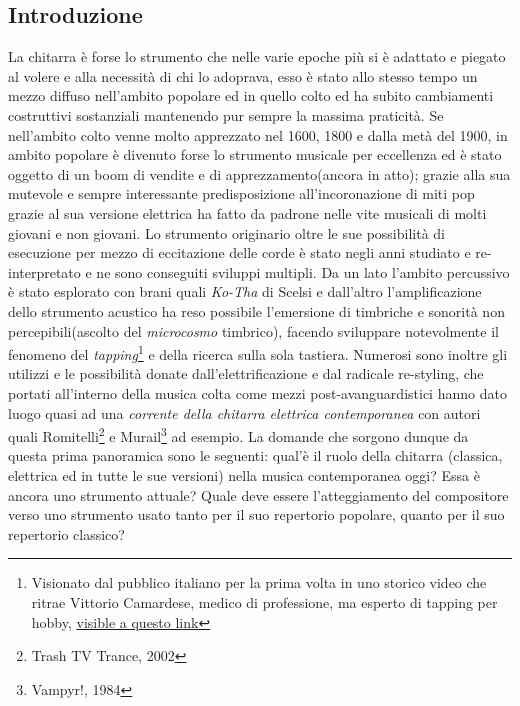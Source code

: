 \documentclass[oneside]{article}
\begin{document}
\newpage
\begin{multicols*}{2} %



\section{ Introduzione}
\noindent

La chitarra è forse lo strumento che nelle varie epoche più si è adattato e piegato al volere e alla necessità di chi lo adoprava, esso è stato allo stesso tempo un mezzo diffuso nell'ambito popolare ed in quello colto ed ha subito cambiamenti costruttivi sostanziali mantenendo pur sempre la massima praticità. Se nell’ambito colto venne molto apprezzato nel 1600, 1800 e dalla metà del 1900, in ambito popolare è divenuto forse lo strumento musicale per eccellenza ed è stato oggetto di un boom di vendite  e di apprezzamento(ancora in atto); grazie alla sua mutevole e sempre interessante predisposizione all’incoronazione di miti pop grazie al sua versione elettrica ha fatto da padrone nelle vite musicali di molti giovani e non giovani. Lo strumento originario oltre le sue possibilità di esecuzione per mezzo di eccitazione delle corde è stato negli anni studiato e re-interpretato e ne sono conseguiti sviluppi multipli. Da un lato l’ambito percussivo è stato esplorato con brani quali \textit{Ko-Tha} di Scelsi e dall’altro l’amplificazione dello strumento acustico ha reso possibile l’emersione di timbriche e sonorità non percepibili(ascolto del \textit{microcosmo} timbrico), facendo sviluppare notevolmente il fenomeno del \textit{tapping}\footnote{Visionato dal pubblico italiano per la prima volta in uno storico video che ritrae Vittorio Camardese, medico di professione, ma esperto di tapping per hobby, \href{https://www.youtube.com/watch?v=UmTQYquqxSY}{visible a questo link}} e della ricerca sulla sola tastiera. Numerosi sono inoltre gli utilizzi e le possibilità donate dall’elettrificazione e dal radicale re-styling, che portati all’interno della musica colta come mezzi post-avanguardistici hanno dato luogo quasi ad una \textit{corrente della chitarra elettrica contemporanea} con autori quali Romitelli\footnote{Trash TV Trance, 2002} e Murail\footnote{Vampyr!, 1984} ad esempio. 
La domande che sorgono dunque da questa prima panoramica sono le seguenti: qual’è il ruolo della chitarra (classica, elettrica ed in tutte le sue versioni) nella musica contemporanea oggi? Essa è ancora uno strumento attuale? Quale deve essere l’atteggiamento del compositore verso uno strumento usato tanto per il suo repertorio popolare, quanto per il suo repertorio classico?


\end{multicols*}
\end{document}

